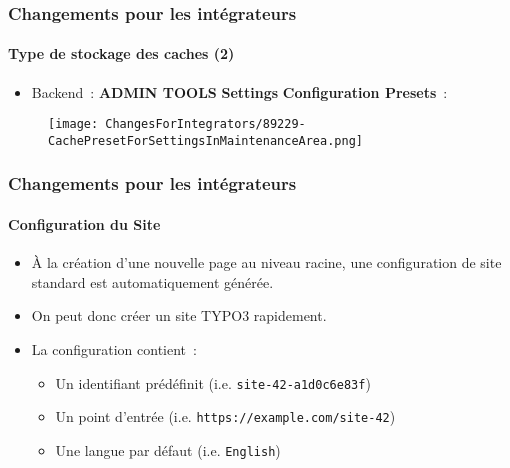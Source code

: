 \begin{frame}[fragile]
	\frametitle{Changements pour les intégrateurs}
	\framesubtitle{Type de stockage des caches (2)}

	\begin{itemize}

		\item Backend~: \textbf{ADMIN TOOLS} \hspace{0.1cm}\textbf{Settings} \hspace{0.1cm}\textbf{Configuration Presets}~:
		\end{itemize}

	\begin{figure}
		\texttt{[image: ChangesForIntegrators/89229-CachePresetForSettingsInMaintenanceArea.png]}
	\end{figure}

\end{frame}


\begin{frame}[fragile]
	\frametitle{Changements pour les intégrateurs}
	\framesubtitle{Configuration du Site}

	\begin{itemize}
		\item À la création d'une nouvelle page au niveau racine, une configuration
			de site standard est automatiquement générée.
		\item On peut donc créer un site TYPO3 rapidement.
		\item La configuration contient~:

			\begin{itemize}
				\item Un identifiant prédéfinit (i.e. \texttt{site-42-a1d0c6e83f})
				\item Un point d'entrée (i.e. \texttt{https://example.com/site-42})
				\item Une langue par défaut (i.e. \texttt{English})
			\end{itemize}

	\end{itemize}

\end{frame}


